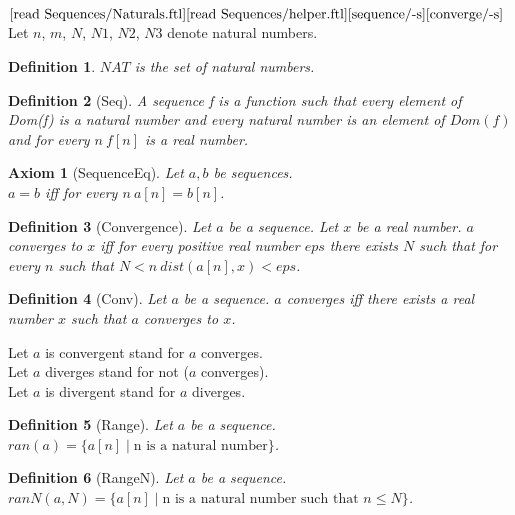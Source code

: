 \documentclass{article}
\newenvironment{forthel}{\begin{leftbar}}{\end{leftbar}}
\newtheorem{axiom}{Axiom}
\newtheorem{definition}{Definition}
\begin{document}
\begin{forthel}
	\noindent $\text{[read Sequences/Naturals.ftl]}\\
	\text{[read Sequences/helper.ftl]}\\
	\text{[sequence/-s]}\\
	\text{[converge/-s]}$\\
	Let $n$, $m$, $N$, $N1$, $N2$, $N3$ denote natural numbers.
	
	\begin{definition}
		$NAT$ is the set of natural numbers.
	\end{definition}
	
	\begin{definition}[Seq]	A sequence f is a function such that every element of Dom(f) is a natural number and every
	natural number is an element of $Dom(f)$ and for every $n \ f[n]$ is a real number.
	\end{definition}
	
	\begin{axiom}[SequenceEq] Let $a, b$ be sequences. \\ $a = b$ iff for every $n \ a[n] = b[n]$.
	\end{axiom}
	
	\begin{definition}[Convergence] Let $a$ be a sequence. Let $x$ be a real number. $a$ converges to $x$ iff for every positive real
	number $eps$ there exists $N$ such that for every $n$ such that $N < n \ dist(a[n],x) < eps$.
	\end{definition}
	
	\begin{definition}[Conv] Let $a$ be a sequence. $a$ converges iff there exists a real number $x$ such that $a$ converges to $x$.
	\end{definition}
	
	\noindent Let $a$ is convergent stand for $a$ converges.
	\\Let $a$ diverges stand for not ($a$ converges).
	\\Let $a$ is divergent stand for $a$ diverges.
	
	\begin{definition}[Range] Let $a$ be a sequence. $ran(a) = \{a[n] \mid \text{n is a natural number} \}$. 
	\end{definition}

	\begin{definition}[RangeN] Let $a$ be a sequence. $ranN(a,N) = \{a[n] \mid \text{n is a natural number such that } n \leq N\}$.
	\end{definition}
	

\end{forthel}
\end{document}
